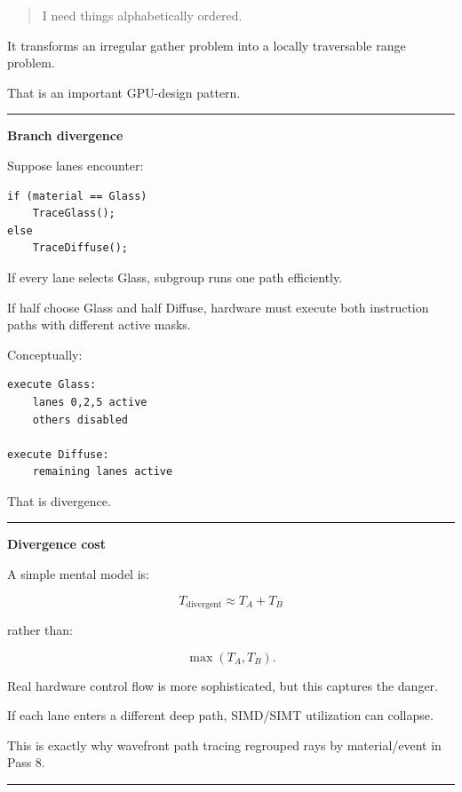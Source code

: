 \begin{quote}
I need things alphabetically ordered.
\end{quote}

It transforms an irregular gather problem into a locally traversable range problem.

That is an important GPU-design pattern.

\begin{center}\rule{0.5\linewidth}{0.5pt}\end{center}

\textbf{Branch divergence}

Suppose lanes encounter:

\protect{}\label{86rlbx}%
\begin{verbatim}
if (material == Glass)
    TraceGlass();
else
    TraceDiffuse();
\end{verbatim}

If every lane selects Glass, subgroup runs one path efficiently.

If half choose Glass and half Diffuse, hardware must execute both instruction paths with different active masks.

Conceptually:

\protect{}\label{c7d0fn}%
\begin{verbatim}
execute Glass:
    lanes 0,2,5 active
    others disabled

execute Diffuse:
    remaining lanes active
\end{verbatim}

That is divergence.

\begin{center}\rule{0.5\linewidth}{0.5pt}\end{center}

\textbf{Divergence cost}

A simple mental model is:

\[
T_{\text{divergent}}
\approx
T_A+T_B
\]

rather than:

\[
\max(T_A,T_B).
\]

Real hardware control flow is more sophisticated, but this captures the danger.

If each lane enters a different deep path, SIMD/SIMT utilization can collapse.

This is exactly why wavefront path tracing regrouped rays by material/event in Pass 8.

\begin{center}\rule{0.5\linewidth}{0.5pt}\end{center}

